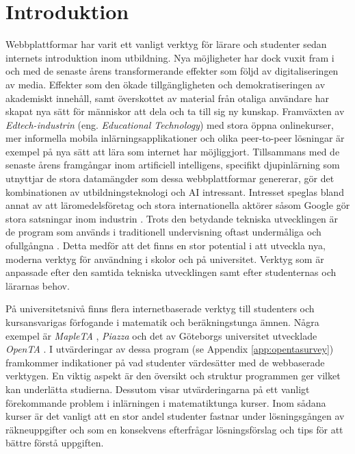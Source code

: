 \chapter{Introduktion}
\label{sec:intro}

Webbplattformar har varit ett vanligt verktyg för lärare och studenter sedan internets introduktion inom utbildning. Nya möjligheter har dock vuxit fram i och med de senaste årens transformerande effekter som följd av digitaliseringen av media. Effekter som den ökade tillgängligheten och demokratiseringen av akademiskt innehåll, samt överskottet av material från otaliga användare har skapat nya sätt för människor att dela och ta till sig ny kunskap. Framväxten av \emph{Edtech-industrin} (eng. \emph{Educational Technology}) med stora öppna onlinekurser, mer informella mobila inlärningsapplikationer och olika peer-to-peer lösningar är exempel på nya sätt att lära som internet har möjliggjort. Tillsammans med de senaste årens framgångar inom artificiell intelligens, specifikt djupinlärning som utnyttjar de stora datamängder som dessa webbplattformar genererar, gör det kombinationen av utbildningsteknologi och AI intressant. Intresset speglas bland annat av att läromedelsföretag och stora internationella aktörer såsom Google gör stora satsningar inom industrin \cite{Metaari}. Trots den betydande tekniska utvecklingen är de program som används i traditionell undervisning oftast undermåliga och ofullgångna \cite{Frodin}. Detta medför att det finns en stor potential i att utveckla nya, moderna verktyg för användning i skolor och på universitet. Verktyg som är anpassade efter den samtida tekniska utvecklingen samt efter studenternas och lärarnas behov. 

På universitetsnivå finns flera internetbaserade verktyg till studenters och kursansvarigas förfogande i matematik och beräkningstunga ämnen. Några exempel är \emph{MapleTA} \cite{MapleTA}, \emph{Piazza} \cite{Piazza} och det av Göteborgs universitet utvecklade \emph{OpenTA} \cite{OpenTA}. I utvärderingar av dessa program (se Appendix \ref{app:opentasurvey}) framkommer indikationer på vad studenter värdesätter med de webbaserade verktygen. En viktig aspekt är den översikt och struktur programmen ger vilket kan underlätta studierna. Dessutom visar utvärderingarna på ett vanligt förekommande problem i inlärningen i matematiktunga kurser. Inom sådana kurser är det vanligt att en stor andel studenter fastnar under lösningsgången av räkneuppgifter och som en konsekvens efterfrågar lösningsförslag och tips för att bättre förstå uppgiften.

